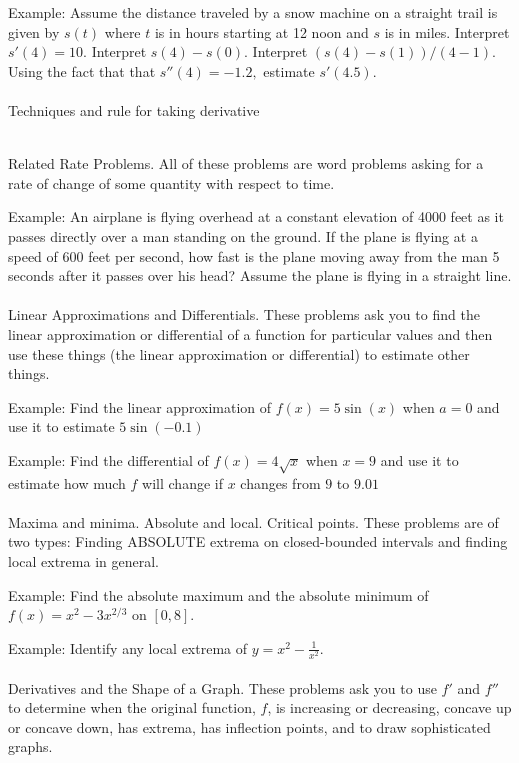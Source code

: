 \documentclass[11pt,fleqn]{article}
\begin{document}
Example: Assume the distance traveled by a snow machine on a straight trail is given by $s(t)$ where $t$ is in hours starting at 12 noon and $s$ is in miles. Interpret $s'(4)=10.$ Interpret $s(4)-s(0).$ Interpret $(s(4)-s(1))/(4-1).$ Using the fact that that $s''(4)=-1.2,$ estimate $s'(4.5).$\\

\noindent {}\\
Techniques and rule for taking derivative

\noindent {}\\
Related Rate Problems. All of these problems are word problems asking for a rate of change of some quantity with respect to time. 

Example:  An airplane is flying overhead at a constant elevation of 4000 feet as it passes directly over a man standing on the ground. If the plane is flying at a speed of 600 feet per second, how fast is the plane moving away from the man 5 seconds after it passes over his head? Assume the plane is flying in a straight line.\\

\noindent {}\\
Linear Approximations and Differentials. These problems ask you to find the linear approximation or differential of a function for particular values and then use these things (the linear approximation or differential) to estimate other things.

Example:  Find the linear approximation of $f(x)=5 \sin (x)$ when $a=0$ and use it to estimate $5 \sin (-0.1)$

Example:  Find the differential of $f(x)=4 \sqrt{x}$ when $x=9$ and use it to estimate  how much $f$ will change if $x$ changes from $9$ to $9.01$\\


\noindent {}\\
Maxima and minima. Absolute and local. Critical points. These problems are of two types: Finding ABSOLUTE extrema on closed-bounded intervals and finding local extrema in general.

Example: Find the absolute maximum and the absolute minimum of $f(x)=x^2-3x^{2/3}$ on $[0,8].$

Example: Identify any local extrema of $y=x^2- \frac{1}{x^2}.$\\

\noindent {}\\
Derivatives and the Shape of a Graph. These problems ask you to use $f'$ and $f''$ to determine when the original function, $f$, is increasing or decreasing, concave up or concave down, has extrema, has inflection points, and to draw sophisticated graphs.
\end{document}
